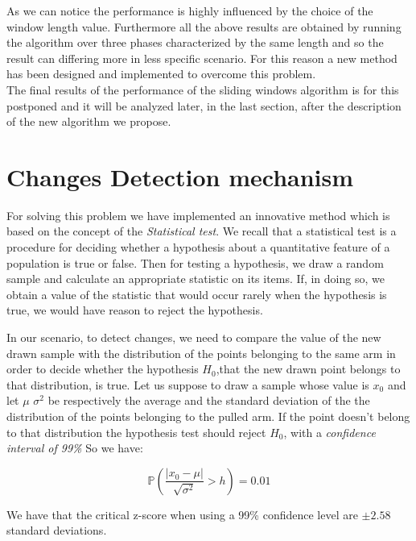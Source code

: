 As we can notice the performance is highly influenced by the choice of the window length value.
Furthermore all the above results are obtained by running the algorithm over three phases characterized by the same length and so the result can differing more in less specific scenario. For this reason a new method has been designed and implemented to overcome this problem.\\
The final results of the performance of the sliding windows algorithm is for this postponed and it will be analyzed later, in the last section, after the description of the new algorithm we propose.


\section{Changes Detection mechanism}

For solving this problem we have implemented an innovative method which is based on the concept of the \textit{Statistical test}.
We recall that a statistical test is a procedure for deciding whether a hypothesis about a quantitative feature of a population is true or false. Then for testing a hypothesis, we draw a random sample and calculate an appropriate statistic on its items. If, in doing so, we obtain a value of the statistic that would occur rarely when the hypothesis is true, we would have reason to reject the hypothesis.

In our scenario, to detect changes, we need to compare the value of the new drawn sample with the distribution of the points belonging to the same arm in order to decide whether the hypothesis $H_0$,that the new drawn point belongs to that distribution, is true.
Let us suppose to draw a sample whose value is $x_0$ and let $\mu$ $\sigma^2$ be respectively the average
and the standard deviation of the the distribution of the points belonging to the pulled arm. 
If the point doesn't belong to that distribution the hypothesis test should reject $H_0$, with a \textit{confidence interval of 99\%} So we have:

\begin{equation}
	 \mathbb{P}\left(\frac{|x_0 - \mu|}{\sqrt{\sigma^2}} > h \right) = 0.01
\end{equation}

We have that the critical z-score when using a 99\% confidence level are $\pm 2.58$ standard deviations.\\

